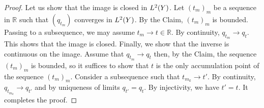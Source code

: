 \documentclass[10pt,a4paper]{amsart}
\newcommand{\R}{\mathbb{R}}
\begin{document}
\begin{proof}
\noindent Let us show that the image is closed in ${\rm L}^2(Y)$. Let $(t_m)_m$ be a sequence in $\R$ such that $(q_{t_m})$ converges in ${\rm L}^2(Y)$. By the Claim, $(t_m)_m$ is bounded. Passing to a subsequence, we may assume $t_m\to t\in\mathbb R$. By continuity, $q_{t_m}\to q_t$. This shows that the image is closed. Finally, we show that the inverse is continuous on the image. Assume that $q_{t_m}\to q_t$ then, by the Claim, the sequence $(t_m)_m$ is bounded, so it suffices to show that $t$ is the only accumulation point of the sequence $(t_m)_m$. Consider a subsequence such that $t_{m_k}\to t'$. By continuity, $q_{t_{m_k}}\to q_{t'}$ and by uniqueness of limits $q_{t'}=q_t$. By injectivity, we have $t'=t$. It completes the proof.\end{proof}
\end{document}
